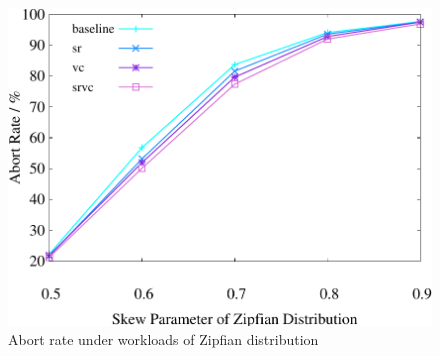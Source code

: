 \begin{figure}[t]
\begin{minipage}[b]{0.32\linewidth}
            \label{fig:basic:tps}
        \end{minipage}    
    \begin{minipage}[b]{0.32\linewidth}
        \centering
        \includegraphics[width=\textwidth]{./exp_fig/basic/abort}
        \vspace{-2em}
        \caption{Abort rate under workloads of Zipfian distribution}
        \label{fig:basic:abort}
    \end{minipage}
\end{figure}


